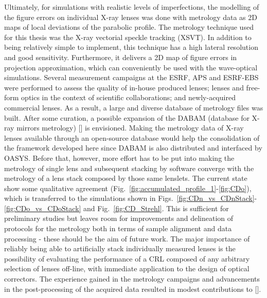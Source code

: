 \begin{refsection}
Ultimately, for simulations with realistic levels of imperfections, the modelling of the figure errors on individual X-ray lenses was done with metrology data as 2D maps of local deviations of the parabolic profile. The metrology technique used for this thesis was the X-ray vectorial speckle tracking (XSVT). In addition to being relatively simple to implement, this technique has a high lateral resolution and good sensitivity. Furthermore, it delivers a 2D map of figure errors in projection approximation, which can conveniently be used with the wave-optical simulations. 
Several measurement campaigns at the ESRF, APS and ESRF-EBS were performed to assess the quality of in-house produced lenses; lenses and free-form optics in the context of scientific collaborations; and newly-acquired commercial lenses. As a result, a large and diverse database of metrology files was built. After some curation, a possible expansion of the DABAM (database for X-ray mirrors metrology) [\cite{SanchezDelRio2016}] is envisioned. Making the metrology data of X-ray lenses available through an open-source database would help the consolidation of the framework developed here since DABAM is also distributed and interfaced by OASYS. Before that, however, more effort has to be put into making the metrology of single lens and subsequent stacking by software converge with the metrology of a lens stack composed by those same lenslets. The current state show some qualitative agreement (Fig.~\ref{fig:accumulated_profile_1}-\ref{fig:CDo}), which is transferred to the simulations shown in Figs.~\ref{fig:CDn_vs_CDnStack}-\ref{fig:CDo_vs_CDoStack} and Fig.~\ref{fig:CD_Strehl}. This is sufficient for preliminary studies but leaves room for improvements and delineation of protocols for the metrology both in terms of sample alignment and data processing - these should be the aim of future work. The major importance of reliably being able to artificially stack individually measured lenses is the possibility of evaluating the performance of a CRL composed of any arbitrary selection of lenses off-line, with immediate application to the design of optical correctors. The experience gained in the metrology campaigns and advancements in the post-processing of the acquired data resulted in modest contributions to [\cite{Berujon2020a,Berujon2020,Qiao2020b}].


\end{refsection}
